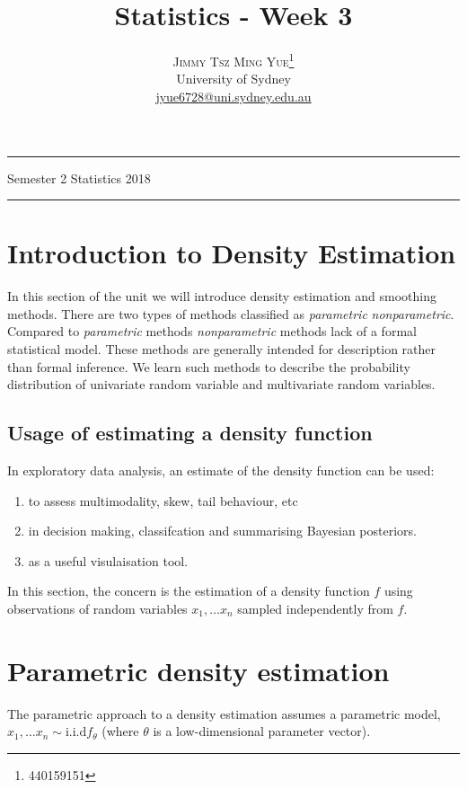 \documentclass[twoside]{article}
\title{\vspace{-15mm}\fontsize{24pt}{10pt}\selectfont\textbf{Statistics - Week 3}} %
\author{
\large
\textsc{Jimmy Tsz Ming Yue}\thanks{440159151}\\[2mm] %
\normalsize University of Sydney \\ %
\normalsize \href{mailto:jyue6728@uni.sydney.edu.au}{jyue6728@uni.sydney.edu.au} %
\vspace{-5mm}
}
\date{}
\theoremstyle{definition}
\theoremstyle{definition}
\begin{document}


\maketitle %

\thispagestyle{fancy} %
\hrule \smallskip

\noindent Semester 2 \quad Statistics \hspace{10.5
cm} 2018
\smallskip
\hrule
\smallskip
\tableofcontents

\section{Introduction to Density Estimation}
In this section of the unit we will introduce density estimation and smoothing methods. There are two types of methods classified as \emph{parametric} \emph{nonparametric}. Compared to \emph{parametric} methods \emph{nonparametric} methods lack of a formal statistical model. These methods are generally intended for description rather than formal inference. We learn such methods to describe the probability distribution of univariate random variable and multivariate random variables. 

\subsection{Usage of estimating a density function}
In exploratory data analysis, an estimate of the density function can be used: 
\begin{enumerate}
	\item to assess multimodality, skew, tail behaviour, etc
	\item in decision making, classifcation and summarising Bayesian posteriors.
	\item as a useful visulaisation tool. 
\end{enumerate}
In this section, the concern is the estimation of a density function $f$ using observations of random variables $x_1,  \dots x_n$ sampled independently from $f$. 

\section{Parametric density estimation}
The parametric approach to a density estimation assumes a parametric model, $x_1, \dots x_n \sim \text{i.i.d} f_\theta$ (where $\theta$ is a low-dimensional parameter vector). 
\end{document}

